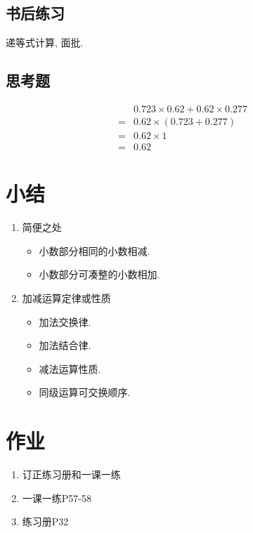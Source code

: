 \begin{CJK}{UTF8}{gkai}
\subsection{书后练习}
递等式计算, 面批.

\subsection{思考题}
\begin{align*}
&0.723 \times 0.62+0.62 \times 0.277 \\
=&0.62 \times (0.723+0.277)\\
=&0.62 \times 1\\
=&0.62
\end{align*}

\section{小结}
\begin{enumerate}
\item 简便之处{\begin{itemize}
\item 小数部分相同的小数相减.
\item 小数部分可凑整的小数相加.
\end{itemize}}
\item 加减运算定律或性质{\begin{itemize}
\item 加法交换律.
\item 加法结合律.
\item 减法运算性质.
\item 同级运算可交换顺序.
\end{itemize}}
\end{enumerate}

\section{作业}
\begin{enumerate}
\item 订正练习册和一课一练
\item 一课一练P57-58
\item 练习册P32
\end{enumerate}


\end{CJK}
